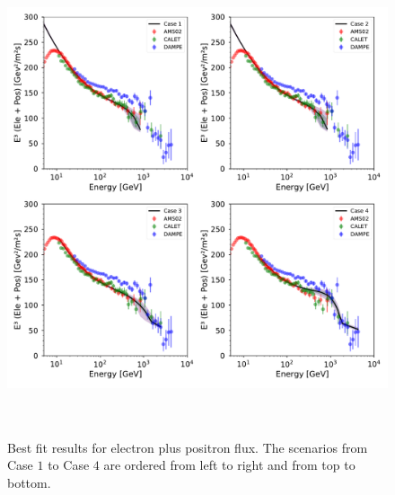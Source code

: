 \documentclass[a4paper,11pt]{article}
\begin{document}
\begin{figure}[htb]
\begin{center}
\includegraphics[height=14cm,width=14cm,angle=0]{Figures/pymultinest_fit_case_5_electron_plus_positron.pdf}
\caption{Best fit results for electron plus positron flux. The scenarios from Case $1$ to Case $4$ are ordered from left to right and from top to bottom.}
\label{fig:bf-electron-plus-positron-spectrum}
\end{center}
\end{figure}
\end{document}

